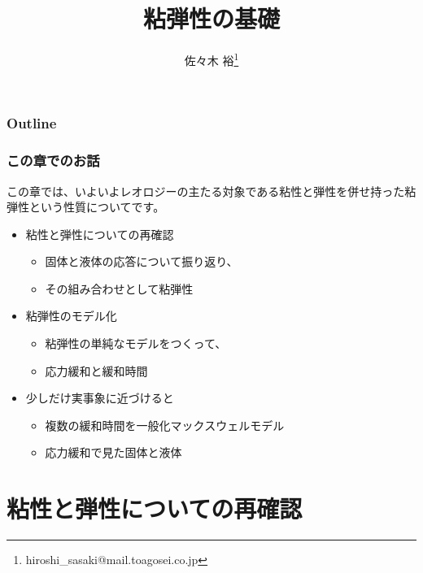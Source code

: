 \documentclass[12pt, dvipdfmx]{beamer}
\title
[粘弾性の基礎]
{粘弾性の基礎}
\author[東亞合成　佐々木]{佐々木 裕\thanks{hiroshi\_sasaki@mail.toagosei.co.jp}}
\institute[東亞合成]{東亞合成株式会社}
\date{}
\begin{document}
\maketitle

\begin{frame}
\frametitle{Outline}
\tableofcontents
\end{frame}

\begin{frame}
	\frametitle{この章でのお話}
	この章では、いよいよレオロジーの主たる対象である粘性と弾性を併せ持った粘弾性という性質についてです。
		\begin{boxnote}
			\vspace{-3mm}
			\begin{itemize}
				\item 粘性と弾性についての再確認
					\begin{itemize}
						\item 固体と液体の応答について振り返り、
						\item その組み合わせとして粘弾性
					\end{itemize} 
				\item 粘弾性のモデル化
					\begin{itemize}
						\item 粘弾性の単純なモデルをつくって、
						\item 応力緩和と緩和時間
					\end{itemize} 
				\item 少しだけ実事象に近づけると
					\begin{itemize}
						\item 複数の緩和時間を一般化マックスウェルモデル
						\item 応力緩和で見た固体と液体
					\end{itemize}
			\end{itemize}
		\end{boxnote}
\end{frame}

\section{粘性と弾性についての再確認}
\end{document}
